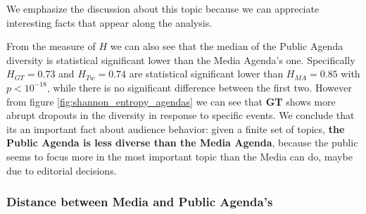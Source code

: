 \documentclass{bmcart}
\begin{document}
We emphasize the discussion about this topic because we can appreciate  interesting facts that appear along the analysis.
\par From the measure of $H$ we can also see that the median of the Public Agenda diversity is statistical significant lower than the Media Agenda's one.
Specifically $H_{GT} = 0.73$ and $H_{Tw} = 0.74$ are statistical significant lower than $H_{MA} = 0.85$ with $p < 10^{-18}$, while there is no significant difference between the first two. 
However from figure \ref{fig:shannon_entropy_agendas} we can see that \textbf{GT} shows more abrupt dropouts in the diversity in response to specific events.
We conclude that its an important fact about audience behavior: given a finite set of topics, \textbf{the Public Agenda is less diverse than the Media Agenda}, because the public seems to focus more in the most important topic than the Media can do, maybe due to editorial decisions.

\subsubsection*{Distance between Media and Public Agenda's }
\end{document}
